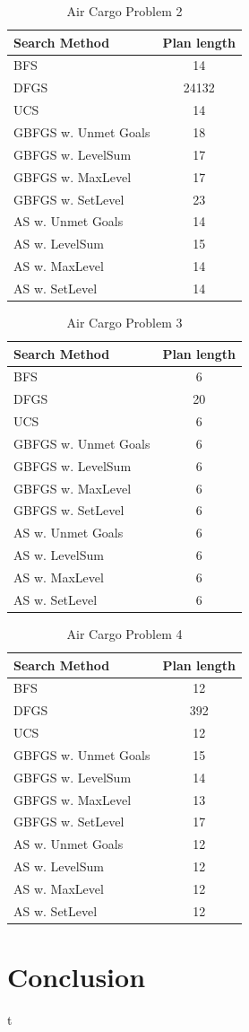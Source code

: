 \documentclass[a4paper]{article}
\begin{document}
    
\begin{table}[htpb]
    \caption{ Air Cargo Problem 2 }
    \centering
    \begin{tabular}{ l | c }
    Search Method & Plan length \\ \hline 
BFS & 14 \\
DFGS & 24132 \\
UCS & 14 \\
GBFGS w. Unmet Goals & 18 \\
GBFGS w. LevelSum & 17 \\
GBFGS w. MaxLevel & 17 \\
GBFGS w. SetLevel & 23 \\
AS w. Unmet Goals & 14 \\
AS w. LevelSum & 15 \\
AS w. MaxLevel & 14 \\
AS w. SetLevel & 14
\end{tabular}
    \label{airps2}
    \end{table}

    
\begin{table}[htpb]
    \caption{ Air Cargo Problem 3 }
    \centering
    \begin{tabular}{ l | c }
    Search Method & Plan length \\ \hline 
BFS & 6 \\
DFGS & 20 \\
UCS & 6 \\
GBFGS w. Unmet Goals & 6 \\
GBFGS w. LevelSum & 6 \\
GBFGS w. MaxLevel & 6 \\
GBFGS w. SetLevel & 6 \\
AS w. Unmet Goals & 6 \\
AS w. LevelSum & 6 \\
AS w. MaxLevel & 6 \\
AS w. SetLevel & 6
\end{tabular}
    \label{airps3}
    \end{table}

    
\begin{table}[htpb]
    \caption{ Air Cargo Problem 4 }
    \centering
    \begin{tabular}{ l | c }
    Search Method & Plan length \\ \hline 
BFS & 12 \\
DFGS & 392 \\
UCS & 12 \\
GBFGS w. Unmet Goals & 15 \\
GBFGS w. LevelSum & 14 \\
GBFGS w. MaxLevel & 13 \\
GBFGS w. SetLevel & 17 \\
AS w. Unmet Goals & 12 \\
AS w. LevelSum & 12 \\
AS w. MaxLevel & 12 \\
AS w. SetLevel & 12
\end{tabular}
    \label{airps4}
    \end{table}

    

\section{Conclusion}
t



\end{document}
